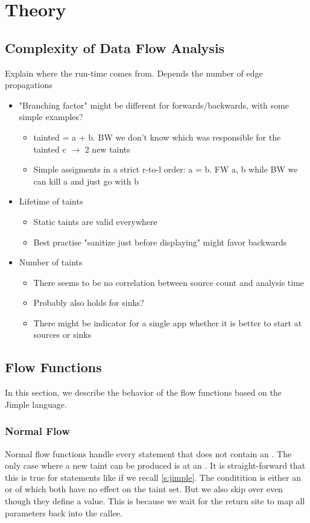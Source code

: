\documentclass[../draft.tex]{subfiles}
\begin{document}
    \chapter{Theory}
    \section{Complexity of Data Flow Analysis}
    Explain where the run-time comes from.
    Depends the number of edge propagations
    \begin{itemize}
        \item "Branching factor" might be different for forwards/backwards, with some simple examples?
            \begin{itemize}
                \item  tainted = a + b. BW we don't know which was responsible for the tainted c $\rightarrow$ 2 new taints
                \item Simple assigments in a strict r-to-l order: a = b. FW {a, b} while BW we can kill a and just go with {b}
            \end{itemize}
        \item Lifetime of taints 
        \begin{itemize}
            \item Static taints are valid everywhere
            \item Best practise "sanitize just before displaying" might favor backwards
        \end{itemize}
        \item Number of taints
        \begin{itemize}
            \item There seems to be no correlation between source count and analysis time
            \item Probably also holds for sinks?
            \item There might be indicator for a single app whether it is better to start at sources or sinks
        \end{itemize}


    \end{itemize}
    \section{Flow Functions}
    In this section, we describe the behavior of the flow functions based on the Jimple language.

    \subsection{Normal Flow}
    Normal flow functions handle every statement that does not contain an . The only case where a new taint can be produced is at an . It is straight-forward that this is true for statements like  if we recall \autoref{s:jimple}. The conditition is either an  or  of which both have no effect on the taint set. But we also skip over  even though they define a value. This is because we wait for the return site to map all parameters back into the callee.
\end{document}
